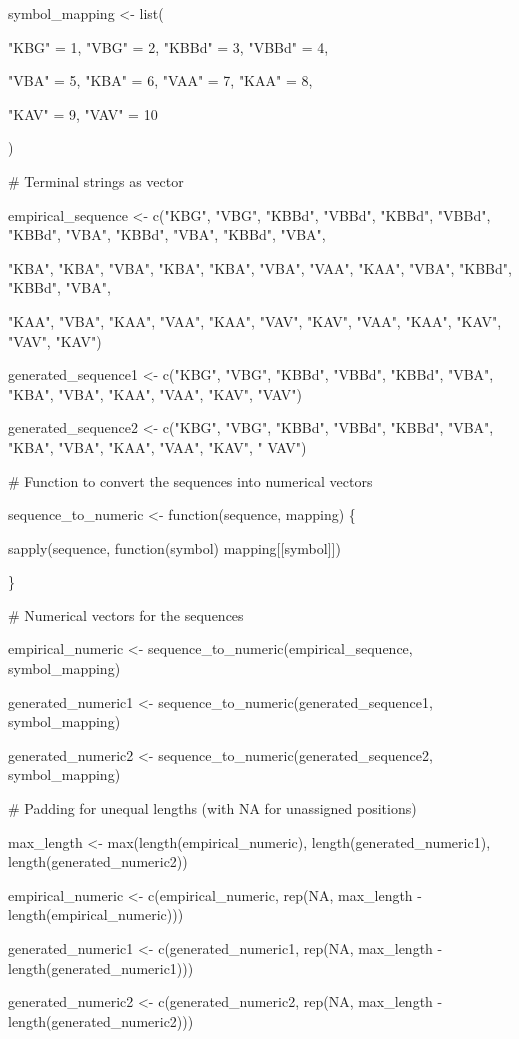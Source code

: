 \documentclass[
]{article}
\begin{document}
symbol\_mapping \textless- list(

"KBG" = 1, "VBG" = 2, "KBBd" = 3, "VBBd" = 4,

"VBA" = 5, "KBA" = 6, "VAA" = 7, "KAA" = 8,

"KAV" = 9, "VAV" = 10

)

\# Terminal strings as vector

empirical\_sequence \textless- c("KBG", "VBG", "KBBd", "VBBd", "KBBd",
"VBBd", "KBBd", "VBA", "KBBd", "VBA", "KBBd", "VBA",

"KBA", "KBA", "VBA", "KBA", "KBA", "VBA", "VAA", "KAA", "VBA", "KBBd",
"KBBd", "VBA",

"KAA", "VBA", "KAA", "VAA", "KAA", "VAV", "KAV", "VAA", "KAA", "KAV",
"VAV", "KAV")

generated\_sequence1 \textless- c("KBG", "VBG", "KBBd", "VBBd", "KBBd",
"VBA", "KBA", "VBA", "KAA", "VAA", "KAV", "VAV")

generated\_sequence2 \textless- c("KBG", "VBG", "KBBd", "VBBd", "KBBd",
"VBA", "KBA", "VBA", "KAA", "VAA", "KAV", " VAV")

\# Function to convert the sequences into numerical vectors

sequence\_to\_numeric \textless- function(sequence, mapping) \{

sapply(sequence, function(symbol) mapping{[}{[}symbol{]}{]})

\}

\# Numerical vectors for the sequences

empirical\_numeric \textless- sequence\_to\_numeric(empirical\_sequence,
symbol\_mapping)

generated\_numeric1 \textless-
sequence\_to\_numeric(generated\_sequence1, symbol\_mapping)

generated\_numeric2 \textless-
sequence\_to\_numeric(generated\_sequence2, symbol\_mapping)

\# Padding for unequal lengths (with NA for unassigned positions)

max\_length \textless- max(length(empirical\_numeric),
length(generated\_numeric1), length(generated\_numeric2))

empirical\_numeric \textless- c(empirical\_numeric, rep(NA, max\_length
- length(empirical\_numeric)))

generated\_numeric1 \textless- c(generated\_numeric1, rep(NA,
max\_length - length(generated\_numeric1)))

generated\_numeric2 \textless- c(generated\_numeric2, rep(NA,
max\_length - length(generated\_numeric2)))
\end{document}
